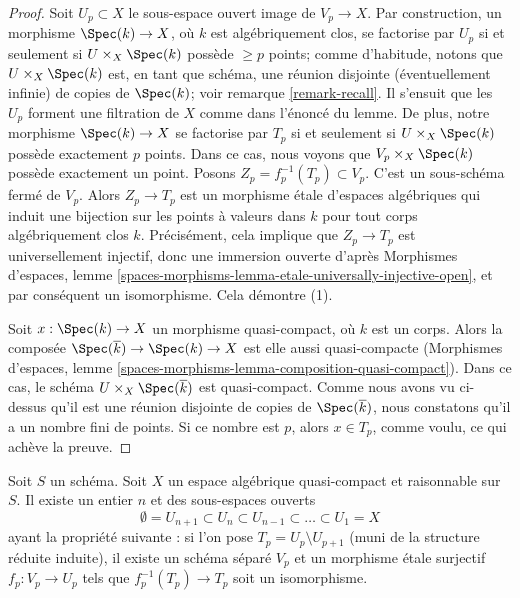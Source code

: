 \begin{proof}
\medskip\noindent
Soit $U_p \subset X$ le sous-espace ouvert image de $V_p \to X$.
Par construction, un morphisme $\Spec(k) \to X$, où $k$ est
algébriquement clos, se factorise par $U_p$ si et seulement si
$U \times_X \Spec(k)$ possède $\geq p$ points; comme d'habitude, notons que
$U \times_X \Spec(k)$ est, en tant que schéma, une réunion disjointe
(éventuellement infinie) de copies de $\Spec(k)$; voir
remarque \ref{remark-recall}. Il s'ensuit que les $U_p$ forment une filtration
de $X$ comme dans l'énoncé du lemme. De plus, notre morphisme
$\Spec(k) \to X$ se factorise par $T_p$ si et seulement si
$U \times_X \Spec(k)$ possède exactement $p$ points. Dans ce cas, nous
voyons que $V_p \times_X \Spec(k)$ possède exactement un point.
Posons $Z_p = f_p^{-1}(T_p) \subset V_p$. C'est un sous-schéma fermé de
$V_p$. Alors $Z_p \to T_p$ est un morphisme étale d'espaces algébriques qui
induit une bijection sur les points à valeurs dans $k$ pour tout corps
algébriquement clos $k$. Précisément, cela implique que $Z_p \to T_p$ est
universellement injectif, donc une immersion ouverte d'après
Morphismes d'espaces, lemme
\ref{spaces-morphisms-lemma-etale-universally-injective-open},
et par conséquent un isomorphisme. Cela démontre (1).

\medskip\noindent
Soit $x : \Spec(k) \to X$ un morphisme quasi-compact, où $k$ est un corps.
Alors la composée $\Spec(\overline{k}) \to \Spec(k) \to X$ est elle aussi
quasi-compacte (Morphismes d'espaces, lemme
\ref{spaces-morphisms-lemma-composition-quasi-compact}).
Dans ce cas, le schéma $U \times_X \Spec(\overline{k})$ est quasi-compact.
Comme nous avons vu ci-dessus qu'il est une réunion disjointe de copies de
$\Spec(\overline{k})$, nous constatons qu'il a un nombre fini de points.
Si ce nombre est $p$, alors $x \in T_p$, comme voulu, ce qui achève la preuve.
\end{proof}

\begin{lemma}
\label{lemma-filter-reasonable}
Soit $S$ un schéma. Soit $X$ un espace algébrique quasi-compact et raisonnable
sur $S$. Il existe un entier $n$ et des sous-espaces ouverts
$$
\emptyset = U_{n + 1} \subset
U_n \subset U_{n - 1} \subset \ldots \subset U_1 = X
$$
ayant la propriété suivante : si l'on pose $T_p = U_p \setminus U_{p + 1}$
(muni de la structure réduite induite), il existe un schéma séparé $V_p$ et
un morphisme étale surjectif $f_p : V_p \to U_p$ tels que
$f_p^{-1}(T_p) \to T_p$ soit un isomorphisme.
\end{lemma}

